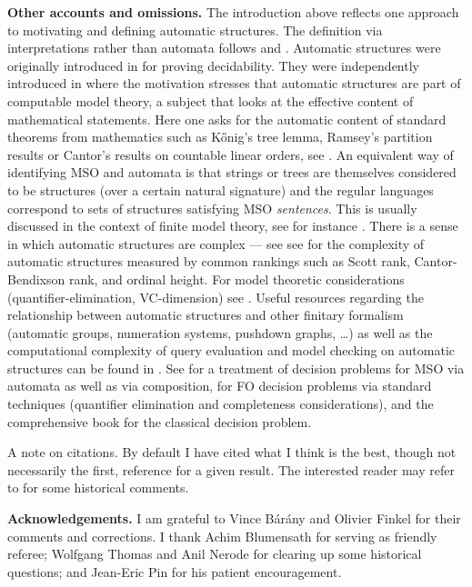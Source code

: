 {\bf Other accounts and omissions.}
The introduction above reflects one approach to motivating and defining automatic structures. The definition via interpretations rather than automata follows \cite{Blum99,BlGr00} and \cite{CoLo07}. 
Automatic structures were originally introduced in \cite{Hodg76,Hodg83} for proving decidability. They were independently introduced in \cite{KhNe95} where the motivation stresses that automatic structures are part of computable model theory, a subject that looks at the effective content of mathematical statements. Here one asks for the automatic content of standard theorems from mathematics such as K\H{o}nig's tree lemma, Ramsey's partition results or Cantor's results on countable linear orders, see \cite{Rubi08,Kusk03,Kusk10,KuLo10}. An equivalent way of identifying MSO and automata is that strings or trees are themselves considered to be structures (over a certain natural signature) and the regular languages correspond to sets of structures satisfying MSO {\em sentences}. This is usually discussed in the context of finite model theory, see for instance \cite{EbFl95}.  There is a sense in which automatic structures are complex --- see  see \cite{KRS05} \cite{KhMi08} for the complexity of automatic structures measured by common rankings such as Scott rank, Cantor-Bendixson rank, and ordinal height. For model theoretic considerations (quantifier-elimination, VC-dimension) see \cite{BLSS03}. Useful resources regarding the relationship between automatic structures and other finitary formalism (automatic groups, numeration systems, pushdown graphs, \dots) as well as the computational complexity of query evaluation and model checking on automatic structures can be found in \cite{BlGr00}  \cite{KuLo09} \cite{BaGrRu11}.  See  \cite{Gure85} for a treatment of decision problems  for MSO via automata as well as via composition, \cite{Rabi77} for FO decision problems via standard techniques  (quantifier elimination and completeness considerations), and the comprehensive book \cite{BGG97} for the classical decision problem. 

A note on citations. By default I have cited what I think is the best, though not necessarily the first, reference for a given result. The interested reader may refer to \cite{Rubi08} for some historical comments.


{\bf Acknowledgements.} I am grateful to Vince B{\'a}r{\'a}ny and Olivier Finkel for their comments and corrections. I thank Achim Blumensath for serving as friendly referee; Wolfgang Thomas and Anil Nerode for clearing up some historical questions; and Jean-Eric Pin for his patient encouragement.

